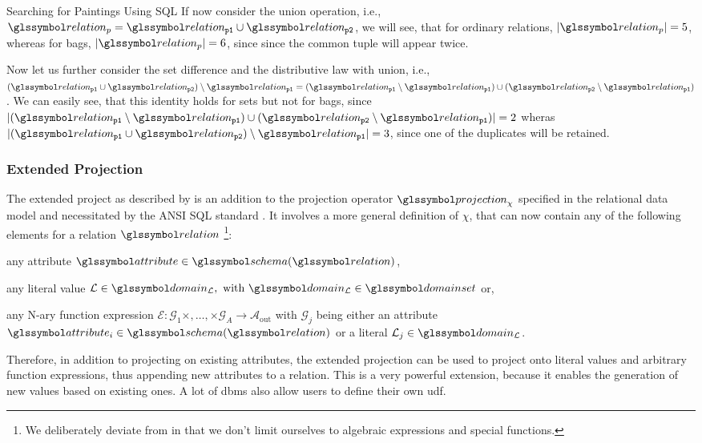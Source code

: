 \begin{example}[label=example:bag_vs_set]{Searching for Paintings Using SQL}{}
    If now consider the union operation, i.e., $\relation_{p} = \relation_{\mathtt{p1}} \cup \relation_{\mathtt{p2}}$, we will see, that for ordinary relations, $|\relation_{p}| = 5$, whereas for bags, $|\relation_{p}| = 6$, since since the common tuple will appear twice.

    Now let us further consider the set difference and the distributive law with union, i.e., $(\relation_{\mathtt{p1}} \cup \relation_{\mathtt{p2}}) \setminus \relation_{\mathtt{p1}} = (\relation_{\mathtt{p1}} \setminus \relation_{\mathtt{p1}}) \cup (\relation_{\mathtt{p2}} \setminus \relation_{\mathtt{p1}})$. We can easily see, that this identity holds for sets but not for bags, since $|(\relation_{\mathtt{p1}} \setminus \relation_{\mathtt{p1}}) \cup (\relation_{\mathtt{p2}} \setminus \relation_{\mathtt{p1}})| = 2$ wheras $|(\relation_{\mathtt{p1}} \cup \relation_{\mathtt{p2}}) \setminus \relation_{\mathtt{p1}}| = 3$, since one of the duplicates will be retained.
\end{example}

\subsubsection{Extended Projection}

The extended project as described by \cite{Garcia:2009Database} is an addition to the projection operator $\projection_{\chi}$ specified in the relational data model and necessitated by the ANSI SQL standard \cite[]{XOpen:1996SQL}. It involves a more general definition of $\chi$, that can now contain any of the following elements for a relation $\relation$ \footnote{We deliberately deviate from \cite{Garcia:2009Database} in that we don't limit ourselves to algebraic expressions and special functions.}:
\begin{enumerate*}[label=(\roman*)]
    \item any attribute $\attribute \in \schema(\relation)$,
    \item any literal value $\mathcal{L} \in \domain_{\mathcal{L}}, \text{ with } \domain_{\mathcal{L}} \in \domainset$ or,
    \item any N-ary function expression $\mathcal{E} \colon \mathcal{G}_1 \times, \ldots, \times \mathcal{G}_A \rightarrow \mathcal{A}_{\text{out}}$ with $\mathcal{G}_j$ being either an attribute $\attribute_i \in \schema(\relation)$ or a literal $\mathcal{L}_j \in \domain_{\mathcal{L}}$.
\end{enumerate*}

Therefore, in addition to projecting on existing attributes, the extended projection can be used to project onto literal values and arbitrary function expressions, thus appending new attributes to a relation. This is a very powerful extension, because it enables the generation of new values based on existing ones. A lot of \acrshort{dbms} also allow users to define their own \acrfull{udf}.

